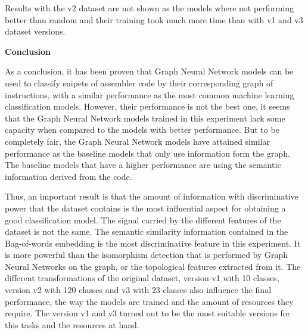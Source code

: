 Results with the v2 dataset are not shown as the models where not performing better than random and their training took much more time than with v1 and v3 dataset versions.

\textbf{Conclusion}

As a conclusion, it has been proven that Graph Neural Network models can be used to classify snipets of assembler code by their corresponding graph of instructions, with a similar performance as the most common machine learning classification models.  However, their performance is not the best one, it seems that the Graph Neural Network models trained in this experiment lack some capacity when compared to the models with better performance. But to be completely fair, the Graph Neural Network models have attained similar performance as the baseline models that only use information form the graph. The baseline models that have a higher performance are using the semantic information derived from the code.

Thus, an important result is that the amount of information with discriminative power that the dataset contains is the most influential aspect for obtaining a good classification model.
The signal carried by the different features of the dataset is not the same. The semantic similarity information contained in the Bag-of-words embedding is the most discriminative feature in this experiment. It is more powerful than the isomorphism detection that is performed by Graph Neural Networks on the graph, or the topological features extracted from it.
The different transformations of the original dataset, version v1 with 10 classes, version v2 with 120 classes and v3 with 23 classes also influence the final performance, the way the models are trained and the amount of resources they require. The version v1 and v3 turned out to be the most suitable versions for this tasks and the resources at hand. 




